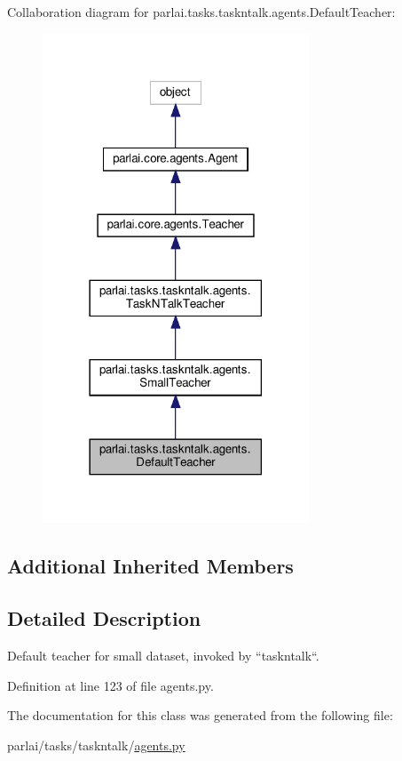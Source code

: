 Collaboration diagram for parlai.\+tasks.\+taskntalk.\+agents.\+Default\+Teacher\+:
\nopagebreak
\begin{figure}[H]
\begin{center}
\leavevmode
\includegraphics[width=225pt]{d3/d80/classparlai_1_1tasks_1_1taskntalk_1_1agents_1_1DefaultTeacher__coll__graph}
\end{center}
\end{figure}
\subsection*{Additional Inherited Members}


\subsection{Detailed Description}
\begin{DoxyVerb}Default teacher for small dataset, invoked by ``taskntalk``.
\end{DoxyVerb}
 

Definition at line 123 of file agents.\+py.



The documentation for this class was generated from the following file\+:\begin{DoxyCompactItemize}
\item 
parlai/tasks/taskntalk/\hyperlink{parlai_2tasks_2taskntalk_2agents_8py}{agents.\+py}\end{DoxyCompactItemize}
